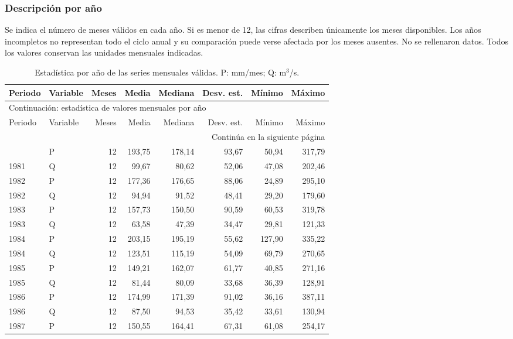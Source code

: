 \documentclass[10pt,a4paper]{article}
\begin{document}
\subsubsection*{Descripción por año}
Se indica el número de meses válidos en cada año. Si es menor de 12, las cifras
describen únicamente los meses disponibles. Los años incompletos no representan
todo el ciclo anual y su comparación puede verse afectada por los meses ausentes.
No se rellenaron datos. Todos los valores conservan las unidades mensuales indicadas.

\begingroup\small
\begin{longtable}{llrrrrrr}
\caption{Estadística por año de las series mensuales válidas. P: mm/mes; Q: m$^3$/s.}\\
\hline
Periodo & Variable & Meses & Media & Mediana & Desv. est. & Mínimo & Máximo \\
\hline\endfirsthead
\multicolumn{8}{l}{Continuación: estadística de valores mensuales por año}\\
\hline
Periodo & Variable & Meses & Media & Mediana & Desv. est. & Mínimo & Máximo \\
\hline\endhead
\hline\multicolumn{8}{r}{Continúa en la siguiente página}\\\endfoot
\hline\endlastfoot
1981 & P & 12 & 193,75 & 178,14 & 93,67 & 50,94 & 317,79 \\
1981 & Q & 12 & 99,67 & 80,62 & 52,06 & 47,08 & 202,46 \\
1982 & P & 12 & 177,36 & 176,65 & 88,06 & 24,89 & 295,10 \\
1982 & Q & 12 & 94,94 & 91,52 & 48,41 & 29,20 & 179,60 \\
1983 & P & 12 & 157,73 & 150,50 & 90,59 & 60,53 & 319,78 \\
1983 & Q & 12 & 63,58 & 47,39 & 34,47 & 29,81 & 121,33 \\
1984 & P & 12 & 203,15 & 195,19 & 55,62 & 127,90 & 335,22 \\
1984 & Q & 12 & 123,51 & 115,19 & 54,09 & 69,79 & 270,65 \\
1985 & P & 12 & 149,21 & 162,07 & 61,77 & 40,85 & 271,16 \\
1985 & Q & 12 & 81,44 & 80,09 & 33,68 & 36,39 & 128,91 \\
1986 & P & 12 & 174,99 & 171,39 & 91,02 & 36,16 & 387,11 \\
1986 & Q & 12 & 87,50 & 94,53 & 35,42 & 33,61 & 130,94 \\
1987 & P & 12 & 150,55 & 164,41 & 67,31 & 61,08 & 254,17 \\

\end{longtable}
\end{document}
